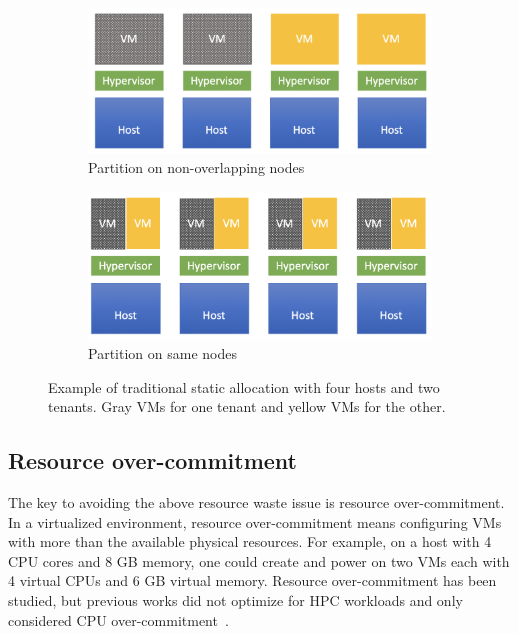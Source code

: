 \begin{figure}
     \centering
     \begin{subfigure}[b]{0.45\textwidth}
         \centering
         \includegraphics[width=\textwidth]{Figures/allocation1}
         \caption{Partition on non-overlapping nodes}
         \label{fig:allocation1}
     \end{subfigure}
     \hfill
     \begin{subfigure}[b]{0.45\textwidth}
         \centering
         \includegraphics[width=\textwidth]{Figures/allocation2}
         \caption{Partition on same nodes}
         \label{fig:allocation2}
     \end{subfigure}
     \caption{Example of traditional static allocation with four hosts and two tenants. Gray VMs for one tenant and yellow VMs for the other.}
     \label{fig:static_allo}
\end{figure}

\subsection{Resource over-commitment}
The key to avoiding the above resource waste issue is resource over-commitment. In a 
virtualized environment, resource over-commitment means configuring VMs with more than the available 
physical resources. For example, on a host with 4 CPU cores and 8 GB memory, one could create and power on two VMs each 
with 4 virtual CPUs and 6 GB virtual memory. Resource over-commitment has been studied, but previous works did not optimize for HPC workloads 
and only considered CPU over-commitment~\cite{tran2019,Tesfatsion2018}.

